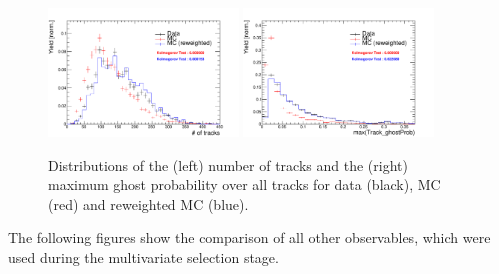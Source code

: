\begin{figure}[ht!]
\includegraphics[height=6.cm,width=0.45\textwidth]{figs/MC-v-Data/nTracks.pdf}
\includegraphics[height=6.cm,width=0.45\textwidth]{figs/MC-v-Data/max_ghostProb.pdf}
\label{fig: reweightingVar}
\caption{Distributions of the (left) number of tracks and the (right) maximum ghost probability over all tracks for data (black), MC (red) and reweighted MC (blue).}
\end{figure}

The following figures show the comparison of all other observables, which were used during the multivariate selection stage.



